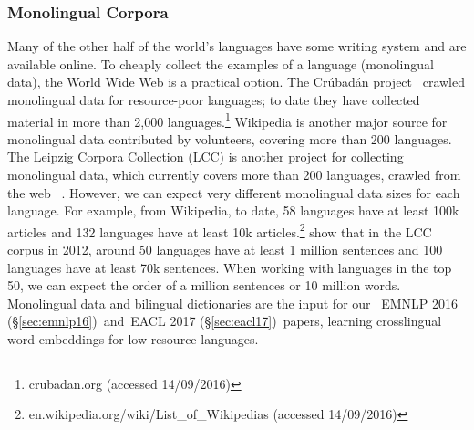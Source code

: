 \documentclass[12pt,twoside,final,hidelinks]{ltthesis}
\theoremstyle{definition}
\newcommand\emnlpvi{EMNLP 2016 (\S\ref{sec:emnlp16})}
\newcommand\eaclvii{EACL 2017 (\S\ref{sec:eacl17})}
\begin{document}
\subsubsection{Monolingual Corpora} 
Many of the other half of the world's languages have some writing system and are available online. To cheaply collect the examples of a language (monolingual data), the World Wide Web is a practical option. 
The Cr\'ubad\'an project~\cite{Scannell07thecrubadan} crawled
 monolingual data for resource-poor languages; to date they have collected material in more than 2,000 languages.\footnote{crubadan.org (accessed 14/09/2016)} Wikipedia is
  another major source for monolingual data contributed by volunteers, covering more than 200 languages. The Leipzig Corpora Collection (LCC) is another project for
   collecting monolingual data, which currently covers more than 200 languages, crawled from the web~\cite{GOLDHAHN12.327.L12-1154} . 
However, we can expect very different monolingual data sizes for each language. For example, from Wikipedia, to date, 58 languages have at least 100k articles and 132 languages have at least 10k articles.\footnote{en.wikipedia.org/wiki/List_of_Wikipedias (accessed 14/09/2016)}
 show that in the LCC corpus in 2012, around 50 languages have at least 1 million sentences and 100 languages have at least 70k sentences. When working with languages in the top 50,  we can expect the order of a million sentences or 10 million words. Monolingual data and bilingual dictionaries are the input for our ~\emnlpvi\ and~\eaclvii\ papers, learning crosslingual word embeddings for low resource languages. 



\end{document}
